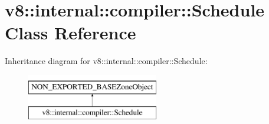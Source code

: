 \hypertarget{classv8_1_1internal_1_1compiler_1_1Schedule}{}\section{v8\+:\+:internal\+:\+:compiler\+:\+:Schedule Class Reference}
\label{classv8_1_1internal_1_1compiler_1_1Schedule}
Inheritance diagram for v8\+:\+:internal\+:\+:compiler\+:\+:Schedule\+:\begin{figure}[H]
\begin{center}
\leavevmode
\includegraphics[height=2.000000cm]{classv8_1_1internal_1_1compiler_1_1Schedule}
\end{center}
\end{figure}
